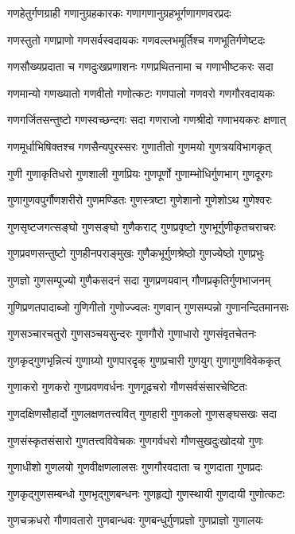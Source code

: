 \twolineshloka
{गणहेतुर्गणग्राही गणानुग्रहकारकः}%
{गणागणानुग्रहभूर्गणागणवरप्रदः}%

\twolineshloka
{गणस्तुतो गणप्राणो गणसर्वस्वदायकः}%
{गणवल्लभमूर्तिश्च गणभूतिर्गणेष्टदः}%

\twolineshloka
{गणसौख्यप्रदाता च गणदुःखप्रणाशनः}%
{गणप्रथितनामा च गणाभीष्टकरः सदा}%

\twolineshloka
{गणमान्यो गणख्यातो गणवीतो गणोत्कटः}%
{गणपालो गणवरो गणगौरवदायकः}%

\twolineshloka
{गणगर्जितसन्तुष्टो गणस्वच्छन्दगः सदा}%
{गणराजो गणश्रीदो गणाभयकरः क्षणात्}%

\twolineshloka
{गणमूर्धाभिषिक्तश्च गणसैन्यपुरस्सरः}%
{गुणातीतो गुणमयो गुणत्रयविभागकृत्}%

\twolineshloka
{गुणी गुणाकृतिधरो गुणशाली गुणप्रियः}%
{गुणपूर्णो गुणाम्भोधिर्गुणभाग् गुणदूरगः}%

\twolineshloka
{गुणागुणवपुर्गौणशरीरो गुणमण्डितः}%
{गुणस्त्रष्टा गुणेशानो गुणेशोऽथ गुणेश्वरः}%

\twolineshloka
{गुणसृष्टजगत्सङ्घो गुणसङ्घो गुणैकराट्}%
{गुणप्रवृष्टो गुणभूर्गुणीकृतचराचरः}%

\twolineshloka
{गुणप्रवणसन्तुष्टो गुणहीनपराङ्मुखः}%
{गुणैकभूर्गुणश्रेष्ठो गुणज्येष्ठो गुणप्रभुः}%

\twolineshloka
{गुणज्ञो गुणसम्पूज्यो गुणैकसदनं सदा}%
{गुणप्रणयवान् गौणप्रकृतिर्गुणभाजनम्}%

\twolineshloka
{गुणिप्रणतपादाब्जो गुणिगीतो गुणोज्ज्वलः}%
{गुणवान् गुणसम्पन्नो गुणानन्दितमानसः}%

\twolineshloka
{गुणसञ्चारचतुरो गुणसञ्चयसुन्दरः}%
{गुणगौरो गुणाधारो गुणसंवृतचेतनः}%

\twolineshloka
{गुणकृद्गुणभृन्नित्यं गुणाग्र्यो गुणपारदृक्}%
{गुणप्रचारी गुणयुग् गुणागुणविवेककृत्}%

\twolineshloka
{गुणाकरो गुणकरो गुणप्रवणवर्धनः}%
{गुणगूढचरो गौणसर्वसंसारचेष्टितः}%

\twolineshloka
{गुणदक्षिणसौहार्दो गुणलक्षणतत्त्ववित्}%
{गुणहारी गुणकलो गुणसङ्घसखः सदा}%

\twolineshloka
{गुणसंस्कृतसंसारो गुणतत्त्वविवेचकः}%
{गुणगर्वधरो गौणसुखदुःखोदयो गुणः}%

\twolineshloka
{गुणाधीशो गुणलयो गुणवीक्षणलालसः}%
{गुणगौरवदाता च गुणदाता गुणप्रदः}%

\twolineshloka
{गुणकृद्गुणसम्बन्धो गुणभृद्गुणबन्धनः}%
{गुणहृद्यो गुणस्थायी गुणदायी गुणोत्कटः}%

\twolineshloka
{गुणचक्रधरो गौणावतारो गुणबान्धवः}%
{गुणबन्धुर्गुणप्रज्ञो गुणप्राज्ञो गुणालयः}%

